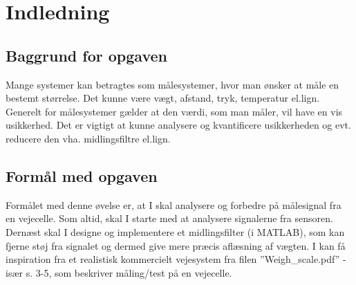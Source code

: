 \graphicspath{{Chapters/Indledning/}}

\chapter{Indledning}

\section{Baggrund for opgaven}
Mange systemer kan betragtes som målesystemer, hvor man ønsker at måle en bestemt størrelse. Det kunne være vægt, afstand, tryk, temperatur el.lign. Generelt for målesystemer gælder at den værdi, som man måler, vil have en vis usikkerhed. Det er vigtigt at kunne analysere og kvantificere usikkerheden og evt. reducere den vha. midlingsfiltre el.lign.

\section{Formål med opgaven}
Formålet med denne øvelse er, at I skal analysere og forbedre på målesignal fra en vejecelle. Som altid, skal I starte med at analysere signalerne fra sensoren. Dernæst skal I designe og implementere et midlingsfilter (i MATLAB), som kan fjerne støj fra signalet og dermed give mere præcis aflæsning af vægten.
I kan få inspiration fra et realistisk kommercielt vejesystem fra filen ”Weigh\_scale.pdf” - især s. 3-5, som beskriver måling/test på en vejecelle.
